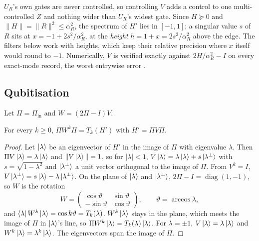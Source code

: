 $U_R$'s own gates are never controlled, so controlling $V$ adds a control to one multi-controlled $Z$ and nothing wider than $U_R$'s widest gate. Since $H\succeq0$ and $\|H\|=\|R\|^2\le\alpha_R^2$, the spectrum of $H'$ lies in $[-1,1]$; a singular value $s$ of $R$ sits at $x=-1+2s^2/\alpha_R^2$, at the \emph{height} $h=1+x=2s^2/\alpha_R^2$ above the edge. The filters below work with heights, which keep their relative precision where $x$ itself would round to $-1$. Numerically, $V$ is verified exactly against $2H/\alpha_R^2-I$ on every exact-mode record, the worst entrywise error .

\subsection{Qubitisation}
\label{app:qubitisation}

Let $\Pi=\Pi_{\mathrm{in}}$ and $W=(2\Pi-I)V$.

\begin{theorem}
\label{thm:qubitisation}
For every $k\ge0$, $\Pi W^k\Pi=T_k(H')$ with $H'=\Pi V\Pi$.
\end{theorem}
\begin{proof}
Let $\ket\lambda$ be an eigenvector of $H'$ in the image of $\Pi$ with eigenvalue $\lambda$. Then $\Pi V\ket\lambda=\lambda\ket\lambda$ and $\|V\ket\lambda\|=1$, so for $|\lambda|<1$, $V\ket\lambda=\lambda\ket\lambda+s\ket{\lambda^\perp}$ with $s=\sqrt{1-\lambda^2}$ and $\ket{\lambda^\perp}$ a unit vector orthogonal to the image of $\Pi$. From $V^2=I$, $V\ket{\lambda^\perp}=s\ket\lambda-\lambda\ket{\lambda^\perp}$. On the plane of $\ket\lambda$ and $\ket{\lambda^\perp}$, $2\Pi-I=\operatorname{diag}(1,-1)$, so $W$ is the rotation
\begin{equation*}
    W=\begin{pmatrix}\cos\vartheta&\sin\vartheta\\-\sin\vartheta&\cos\vartheta\end{pmatrix},
    \qquad\vartheta=\arccos\lambda,
\end{equation*}
and $\bra\lambda W^k\ket\lambda=\cos k\vartheta=T_k(\lambda)$. $W^k\ket\lambda$ stays in the plane, which meets the image of $\Pi$ in $\ket\lambda$'s line, so $\Pi W^k\ket\lambda=T_k(\lambda)\ket\lambda$. For $\lambda=\pm1$, $V\ket\lambda=\lambda\ket\lambda$ and $W^k\ket\lambda=\lambda^k\ket\lambda$. The eigenvectors span the image of $\Pi$.
\end{proof}

